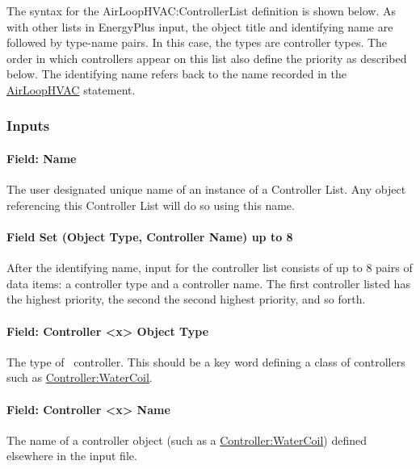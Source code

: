 The syntax for the AirLoopHVAC:ControllerList definition is shown below. As with other lists in EnergyPlus input, the object title and identifying name are followed by type-name pairs. In this case, the types are controller types. The order in which controllers appear on this list also define the priority as described below. The identifying name refers back to the name recorded in the \hyperref[airloophvac]{AirLoopHVAC} statement.

\subsubsection{Inputs}\label{inputs-1-002}

\paragraph{Field: Name}\label{field-name-1-001}

The user designated unique name of an instance of a Controller List. Any object referencing this Controller List will do so using this name.

\paragraph{Field Set (Object Type, Controller Name) up to 8}\label{field-set-object-type-controller-name-up-to-8}

After the identifying name, input for the controller list consists of up to 8 pairs of data items: a controller type and a controller name. The first controller listed has the highest priority, the second the second highest priority, and so forth.

\paragraph{Field: Controller \textless{}x\textgreater{} Object Type}\label{field-controller-x-object-type}

The type of~ controller. This should be a key word defining a class of controllers such as \hyperref[controllerwatercoil]{Controller:WaterCoil}.

\paragraph{Field: Controller \textless{}x\textgreater{} Name}\label{field-controller-x-name}

The name of a controller object (such as a \hyperref[controllerwatercoil]{Controller:WaterCoil}) defined elsewhere in the input file.

